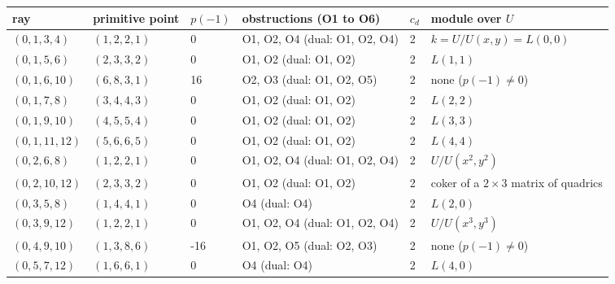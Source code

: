 \begin{tabular}{@{}lllll>{\raggedright\arraybackslash}p{3.6cm}@{}}
\toprule
ray & primitive point & $p(-1)$ & obstructions (O1 to O6) & $c_d$ & module over $U$\\
\midrule
$(0,1,3,4)$ & $(1,2,2,1)$ & 0 & O1, O2, O4 (dual: O1, O2, O4) & 2 & $k=U/U(x,y)=L(0,0)$\\
$(0,1,5,6)$ & $(2,3,3,2)$ & 0 & O1, O2 (dual: O1, O2) & 2 & $L(1,1)$\\
$(0,1,6,10)$ & $(6,8,3,1)$ & 16 & O2, O3 (dual: O1, O2, O5) & 2 & none ($p(-1)\ne0$)\\
$(0,1,7,8)$ & $(3,4,4,3)$ & 0 & O1, O2 (dual: O1, O2) & 2 & $L(2,2)$\\
$(0,1,9,10)$ & $(4,5,5,4)$ & 0 & O1, O2 (dual: O1, O2) & 2 & $L(3,3)$\\
$(0,1,11,12)$ & $(5,6,6,5)$ & 0 & O1, O2 (dual: O1, O2) & 2 & $L(4,4)$\\
$(0,2,6,8)$ & $(1,2,2,1)$ & 0 & O1, O2, O4 (dual: O1, O2, O4) & 2 & $U/U(x^2,y^2)$\\
$(0,2,10,12)$ & $(2,3,3,2)$ & 0 & O1, O2 (dual: O1, O2) & 2 & coker of a $2\times3$ matrix of quadrics\\
$(0,3,5,8)$ & $(1,4,4,1)$ & 0 & O4 (dual: O4) & 2 & $L(2,0)$\\
$(0,3,9,12)$ & $(1,2,2,1)$ & 0 & O1, O2, O4 (dual: O1, O2, O4) & 2 & $U/U(x^3,y^3)$\\
$(0,4,9,10)$ & $(1,3,8,6)$ & -16 & O1, O2, O5 (dual: O2, O3) & 2 & none ($p(-1)\ne0$)\\
$(0,5,7,12)$ & $(1,6,6,1)$ & 0 & O4 (dual: O4) & 2 & $L(4,0)$\\
\bottomrule
\end{tabular}
